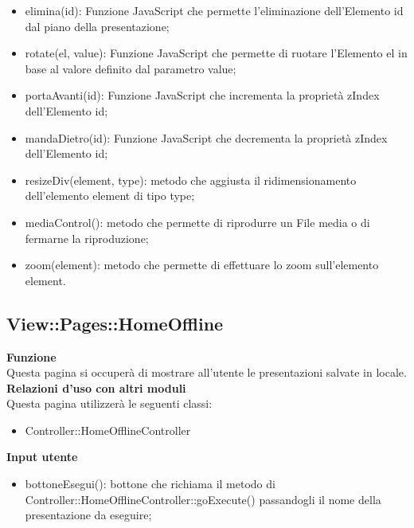 {{\begin{itemize}
		\item elimina(id): Funzione JavaScript che permette l'eliminazione dell'Elemento id dal piano della presentazione;
		\item rotate(el, value): Funzione JavaScript che permette di ruotare l'Elemento el in base al valore definito dal parametro value;
		\item portaAvanti(id): Funzione JavaScript che incrementa la proprietà zIndex dell'Elemento id;
		\item mandaDietro(id): Funzione JavaScript che decrementa la proprietà zIndex dell'Elemento id;
		\item resizeDiv(element, type): metodo che aggiusta il ridimensionamento dell'elemento element di tipo type;
		\item mediaControl(): metodo che permette di riprodurre un File media o di fermarne la riproduzione;
		\item zoom(element): metodo che permette di effettuare lo zoom sull'elemento element.
	\end{itemize}
}
\subsection{View::Pages::HomeOffline}{
	\textbf{Funzione}\\
	\indent Questa pagina si occuperà di mostrare all'utente le presentazioni salvate in locale.\\
	\textbf{Relazioni d'uso con altri moduli}\\
	\indent Questa pagina utilizzerà le seguenti classi:
	\begin{itemize}
		\item Controller::HomeOfflineController
	\end{itemize}
	\textbf{Input utente}
	\begin{itemize}
		\item bottoneEsegui(): bottone che richiama il metodo di Controller::HomeOfflineController::goExecute() passandogli il nome della presentazione da eseguire;
	\end{itemize}
	}
}
